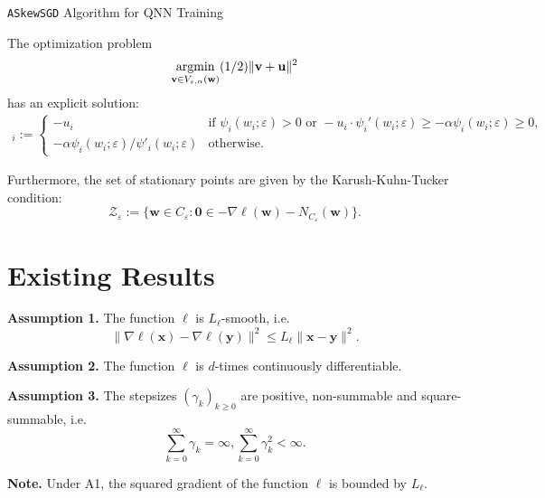 \documentclass[10pt,a4paper]{article}
\begin{document}
\begin{algorithm}[H]
  \caption{\texttt{ASkewSGD} Algorithm for QNN Training}
\end{algorithm}

The optimization problem \[\mathop{\mathrm{argmin}}\limits_{\mathbf{v}\in V_{\varepsilon, \alpha}(\mathbf{w})} (1/2) \lVert \mathbf{v}+\mathbf{u}\rVert^2\] has an explicit solution:
\begin{align*}[\mathbf{s}_{\varepsilon, \alpha}(\mathbf{u},\mathbf{w})]_i:=\begin{cases}-u_i                                                    & \text{if }\psi_i(w_i;\varepsilon)>0 \text{ or }-u_i\cdot \psi_i'(w_i;\varepsilon)\geq -\alpha \psi_i(w_i;\varepsilon)\geq 0, \\
             -\alpha\psi_i(w_i;\varepsilon)/\psi'_i(w_i;\varepsilon) & \text{otherwise}.\end{cases}
\end{align*}

Furthermore, the set of stationary points are given by the Karush-Kuhn-Tucker condition:
\[\mathcal{Z}_\varepsilon:=\{\mathbf{w}\in C_\varepsilon: \mathbf{0}\in -\nabla \ell(\mathbf{w})-N_{C_\varepsilon}(\mathbf{w})\}.\]

\section{Existing Results} 

\textbf{Assumption 1.} The function $\ell$ is $L_\ell$-smooth, i.e. \[\lVert \nabla\ell(\mathbf{x})-\nabla \ell(\mathbf{y})\rVert^2\leq L_\ell \lVert \mathbf{x}-\mathbf{y}\rVert^2.\]

\textbf{Assumption 2.} The function $\ell$ is $d$-times continuously differentiable.

\textbf{Assumption 3.} The stepsizes $(\gamma_k)_{k\geq 0}$ are positive, non-summable and square-summable, i.e. \[\sum\limits_{k=0}^\infty \gamma_k=\infty, \sum\limits_{k=0}^\infty \gamma_k^2<\infty.\]

\textbf{Note.} Under A1, the squared gradient of the function $\ell$ is bounded by $L_\ell$.
\end{document}
